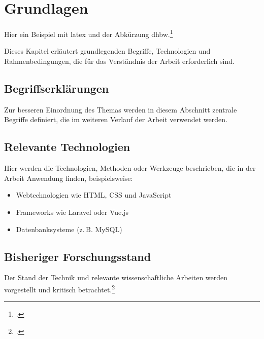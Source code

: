 \section{Grundlagen}


Hier ein Beispiel mit \gls{latex} und der Abkürzung \gls{dhbw}.\footcites[15-20]{muster2025}{webseite2025}


Dieses Kapitel erläutert grundlegenden Begriffe, Technologien und Rahmenbedingungen, die für das Verständnis der Arbeit erforderlich sind.

\subsection{Begriffserklärungen}
Zur besseren Einordnung des Themas werden in diesem Abschnitt zentrale Begriffe definiert, die im weiteren Verlauf der Arbeit verwendet werden.

\subsection{Relevante Technologien}
Hier werden die Technologien, Methoden oder Werkzeuge beschrieben, die in der Arbeit Anwendung finden, beispielsweise:

\begin{itemize}
    \item Webtechnologien wie HTML, CSS und JavaScript
    \item Frameworks wie Laravel oder Vue.js
    \item Datenbanksysteme (z.\,B. MySQL)
\end{itemize}

\subsection{Bisheriger Forschungsstand}
Der Stand der Technik und relevante wissenschaftliche Arbeiten werden vorgestellt und kritisch betrachtet.\footcite[15\psq]{muster2025}
